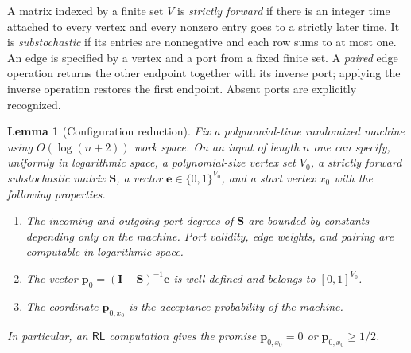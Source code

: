 \documentclass[11pt]{article}
\numberwithin{equation}{section}
\newtheorem{lemma}[theorem]{Lemma}
\theoremstyle{definition}
\theoremstyle{remark}
\newcommand{\RL}{\mathsf{RL}}
\begin{document}
A matrix indexed by a finite set $V$ is \emph{strictly forward} if
there is an integer time attached to every vertex and every nonzero
entry goes to a strictly later time. It is \emph{substochastic} if its
entries are nonnegative and each row sums to at most one. An edge is
specified by a vertex and a port from a fixed finite set. A \emph{paired}
edge operation returns the other endpoint together with its inverse
port; applying the inverse operation restores the first endpoint.
Absent ports are explicitly recognized.

\begin{lemma}[Configuration reduction]\label{lem:model-reduction}
Fix a polynomial-time randomized machine using $O(\log(n+2))$ work
space. On an input of length $n$ one can specify, uniformly in
logarithmic space, a polynomial-size vertex set $V_0$, a strictly
forward substochastic matrix ${\mathbf{S}}$, a vector
${\mathbf{e}}\in\{0,1\}^{V_0}$, and a start vertex $x_0$ with the following
properties.
\begin{enumerate}
\item The incoming and outgoing port degrees of ${\mathbf{S}}$ are bounded by
constants depending only on the machine. Port validity, edge weights,
and pairing are computable in logarithmic space.
\item The vector ${\mathbf{p}}_0=({\mathbf{I}}-{\mathbf{S}})^{-1}{\mathbf{e}}$ is well defined and belongs to
$[0,1]^{V_0}$.
\item The coordinate ${\mathbf{p}}_{0,x_0}$ is the acceptance probability of
the machine.
\end{enumerate}
In particular, an $\RL$ computation gives the promise
${\mathbf{p}}_{0,x_0}=0$ or ${\mathbf{p}}_{0,x_0}\ge1/2$.
\end{lemma}
\end{document}
